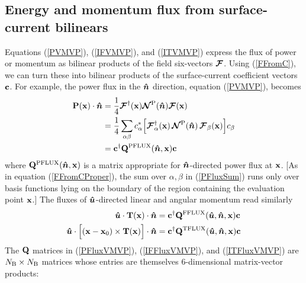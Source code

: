 \documentclass[letterpaper]{article}
\begin{document}
\subsection*{Energy and momentum flux from surface-current bilinears}

Equations (\ref{PVMVP}), (\ref{IFVMVP}), and (\ref{ITVMVP}) express
the flux of power or momentum as bilinear products of the field
six-vectors $\boldsymbol{\mathcal{F}}$. Using (\ref{FFromC}), we can turn these into
bilinear products of the surface-current coefficient vectors
$\mathbf{c}$. For example, the power flux in the $\boldsymbol{\hat{n}}$
direction, equation (\ref{PVMVP}), becomes 
\begin{align}
 \mathbf{P}(\mathbf{x}) \cdot \boldsymbol{\hat{n}}
&=\frac{1}{4}\boldsymbol{\mathcal{F}}^\dagger(\mathbf{x}) \boldsymbol{\mathcal{N}}^{\text{\scriptsize P}}(\boldsymbol{\hat{n}}) \boldsymbol{\mathcal{F}}(\mathbf{x})
\nonumber\\
&=\frac{1}{4}\sum_{\alpha \beta} 
  c_\alpha^* 
  \Big[ \boldsymbol{\mathcal{F}}^\dagger_\alpha(\mathbf{x})
        \,
        \boldsymbol{\mathcal{N}}^{\text{\scriptsize P}}(\boldsymbol{\hat{n}})
        \,
        \boldsymbol{\mathcal{F}}_\beta(\mathbf{x})
  \Big]
  c_\beta 
\label{PFluxSum}\\
&= \mathbf{c}^\dagger \mathbf{Q}^{\text{\scriptsize PFLUX}}(\boldsymbol{\hat{n}}, \mathbf{x}) \mathbf{c} 
\label{PFluxVMVP}
\end{align}
where $\mathbf{Q}^{\text{\scriptsize PFLUX}}(\boldsymbol{\hat{n}}, \mathbf{x})$ is a matrix 
appropriate for $\boldsymbol{\hat{n}}$-directed power flux at $\mathbf{x}$.
[As in equation (\ref{FFromCProper}), the sum over 
 $\alpha,\beta$ in (\ref{PFluxSum}) runs only over basis 
 functions lying on the boundary of the region
 containing the evaluation point $\mathbf{x}$.]
The fluxes of $\boldsymbol{\hat{u}}$-directed linear and angular 
momentum read similarly
\begin{align}
\boldsymbol{\hat{u}} \cdot \mathbf{T}(\mathbf{x}) \cdot \boldsymbol{\hat{n}}
&= \mathbf{c}^\dagger \mathbf{Q}^{\text{\scriptsize FFLUX}}(\boldsymbol{\hat{u}}, \boldsymbol{\hat{n}}, \mathbf{x}) \mathbf{c}
\label{IFFluxVMVP}
\\
\boldsymbol{\hat{u}} 
 \cdot \Big[ (\mathbf{x}-\mathbf{x}_0) \times \mathbf{T}(\mathbf{x}) \Big]
 \cdot \boldsymbol{\hat{n}}
&= \mathbf{c}^\dagger \mathbf{Q}^{\text{\scriptsize TFLUX}}(\boldsymbol{\hat{u}}, \boldsymbol{\hat{n}}, \mathbf{x}) \mathbf{c}
\label{ITFluxVMVP}
\end{align}
The $\mathbf{Q}$ matrices in (\ref{PFluxVMVP}), (\ref{IFFluxVMVP}), and 
(\ref{ITFluxVMVP}) are $N_{\text{\scriptsize B}}\times N_{\text{\scriptsize B}}$ matrices
whose entries are themselves 6-dimensional matrix-vector products:
\end{document}
